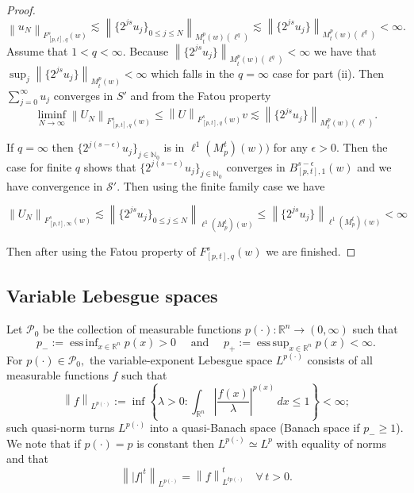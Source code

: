 \documentclass[10pt,a4paper]{article}
\theoremstyle{remark}
\newcommand{\naz}{\mathbb{N}_0}
\newcommand{\rn}{{{\mathbb R}^n}}
\newcommand{\itlw}[4]{F_{#1,#3}^{#2}(#4)} %
\newcommand{\ibesw}[4]{B_{#1,#3}^{#2}(#4)} %
\newcommand{\Lp}{L^{p(\cdot)}} %
\newcommand{\pp}{{p(\cdot)}}
\newcommand{\mow}[3]{M_{#1}^{#2}(#3)}
\def\P{\mathcal P}
\newcommand{\abs}[1]{\left\vert #1 \right\vert}
\newcommand{\norm}[2]{\left\|#1\right\|_{#2}}
\DeclareMathOperator*{\essinf}{ess\,inf}
\DeclareMathOperator*{\esssup}{ess\,sup}
\begin{document}
\begin{proof}
$$ \norm{u_N}{\itlw{[p,t]}{s}{q}{w}} \lesssim \norm{{\{2^{js}}u_j\}_{0\leq j\leq N} }{\mow{t}{p}{w}(\ell^q)} \lesssim \norm{{\{2^{js}}u_j\}}{\mow{t}{p}{w}(\ell^q)} <\infty.$$ Assume that $1<q<\infty$. Because $\norm{{\{2^{js}}u_j\}}{\mow{t}{p}{w}(\ell^q)} <\infty$ we have that $\sup_j\norm{{\{2^{js}}u_j\}}{\mow{t}{p}{w}} <\infty$ which falls in the $q=\infty$ case for part (ii). Then $\sum_{j=0}^\infty u_j$ converges in $S'$ and from the Fatou property 
\[\liminf_{N\rightarrow\infty} \norm{U_N}{\itlw{[p,t]}{s}{q}{w}} \leq \norm{U}{\itlw{[p,t]}{s}{q}{w}}v\lesssim \norm{{\{2^{js}}u_j\}}{\mow{t}{p}{w}(\ell^q)}. \]

If $q=\infty$ then $\{2^{j(s-\epsilon)}u_j\}_{j\in\naz}$ is in $\ell^1(M^t_p)(w))$ for any $\epsilon>0$. Then the case for finite $q$ shows that $\{2^{j(s-\epsilon)}u_j\}_{j\in\naz}$ converges in ${\ibesw{[p,t]}{s-\epsilon}{1}{w}}$ and we have convergence in $\mathcal{S}'$. Then using the finite family case we have 


\[ \norm{U_N}{F^s_{[p,t],\infty}(w)} \lesssim \norm{ \{ 2^{js}u_j \}_{0\leq j\leq N }}{\ell^1(M^t_p)(w)} \leq \norm{ \{ 2^{js}u_j \} }{\ell^1(M^t_p)(w)} < \infty \] 

 Then after using the Fatou property of  $\itlw{[p,t]}{s}{q}{w}$ we are finished.
\end{proof}
\subsection{Variable Lebesgue spaces}
 
 Let  $\P_0$ be the collection of  measurable functions $\pp : \rn \rightarrow (0,\infty)$  such that
\begin{equation*}
p_- := \essinf_{x\in \rn} p(x)>0 \quad\text{ and } \quad p_+ := \esssup_{x\in \rn} p(x)<\infty.
\end{equation*}
For $\pp\in\P_0,$   the variable-exponent Lebesgue space $\Lp$
consists of all measurable functions $f$ such that 
\begin{equation*}
\norm{f}{L^{p(\cdot)}}:=\inf\left\{\lambda>0: \int_{\rn} \abs{\frac{f(x)}{\lambda}}^{p(x)}\,dx\le 1\right\}<\infty;
\end{equation*}
such quasi-norm turns $\Lp$ into  a quasi-Banach  space (Banach space if $p_-\ge1$). 
We note that if $\pp=p$ is constant then  $\Lp\simeq L^p$ with equality of norms and that
\begin{equation}\label{eq:power}
\norm{\abs{f}^t}{\Lp}=\norm{f}{L^{t\pp}}^t\quad \forall\, t>0.
\end{equation} 
\end{document}
